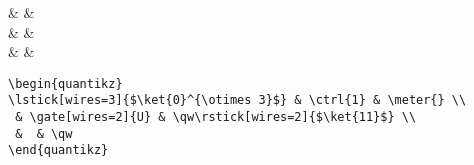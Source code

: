 \documentclass[aps,pra,10pt,nofootinbib]{revtex4}
\begin{document}
\begin{Code}
\begin{center}
\begin{quantikz}
 &  & \meter{} \\
 &  & \qw{} \\
 &  & \qw
\end{quantikz}
\end{center}
\tcblower
\begin{lstlisting}
\begin{quantikz}
\lstick[wires=3]{$\ket{0}^{\otimes 3}$} & \ctrl{1} & \meter{} \\
 & \gate[wires=2]{U} & \qw\rstick[wires=2]{$\ket{11}$} \\
 &  & \qw
\end{quantikz}
\end{lstlisting}
\end{Code}
\end{document}
